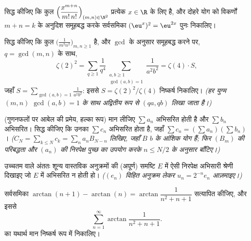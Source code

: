 \begin{exercise}[$\star\star$]\label{exo:b2:series:6}
सिद्ध कीजिए कि कुल $\Bigl(\dfrac{x^{m+n}}{m!\,n!}\Bigr)_{(m,n)\in\N^2}$ प्रत्येक $x \in \R$ के लिए  है, और दोहरे योग को
विकर्णों $m + n =
k$ के अनुदिश समूहबद्ध करके सर्वसमिका $(\eu^x)^2 =
\eu^{2x}$ पुनः निकालिए।
\end{exercise}

\begin{exercise}[$\star\star$]\label{exo:b2:series:7}
सिद्ध कीजिए कि कुल $\bigl(\frac{1}{m^2 n^2}\bigr)_{m,n \geq 1}$  है, और $\gcd$ के अनुसार समूहबद्ध करने पर, $q = \gcd(m,n)$
के साथ,
\[
\zeta(2)^2 = \sum_{q\geq1} \frac{1}{q^4}
\sum_{\substack{a,b \geq 1\\ \gcd(a,b)=1}} \frac{1}{a^2b^2}
= \zeta(4) \cdot S,
\]
जहाँ $S = \sum_{\gcd(a,b)=1} \frac{1}{a^2b^2}$: इससे $S =
\zeta(2)^2/\zeta(4)$ निष्कर्ष निकालिए। \emph{(हर युग्म $(m,n)$ $\gcd(a,b) = 1$ के साथ
अद्वितीय रूप से $(qa, qb)$ लिखा जाता है।)}
\end{exercise}

\begin{exercise}[$\star\star\star$]\label{exo:b2:series:8}
(गुणनफलों पर आबेल की प्रमेय, हल्का रूप) मान लीजिए $\sum a_n$ 
अभिसरित होती है और $\sum b_n$ अभिसरित। सिद्ध कीजिए कि उनका  $\sum c_n$
अभिसरित होता है, जहाँ $\sum c_n = (\sum
a_n)(\sum b_n)$। \emph{($C_N = \sum_{k\leq N} c_k = \sum_n
a_n B_{N-n}$ लिखिए, जहाँ $B$ $b$ के आंशिक योग
हैं; फिर $(B_m)$ की परिबद्धता और $(a_n)$ की निरपेक्ष पुच्छ का उपयोग करके $n \leq N/2$
के अनुसार बाँटिए।)}
\end{exercise}

\begin{exercise}[$\star\star\star$]\label{exo:b2:series:9}
उच्चतम  वाले अंततः शून्य वास्तविक अनुक्रमों की (अपूर्ण) समष्टि $E$
में ऐसी निरपेक्ष अभिसारी श्रेणी दिखाइए जो $E$ में अभिसरित न होती हो।
\emph{($(e_n)$ विहित अनुक्रम लेकर $u_n = 2^{-n} e_n$ आज़माइए।)}
\end{exercise}

\begin{exercise}[$\star\star$]\label{exo:b2:series:10}
सर्वसमिका $\arctan(n+1) - \arctan(n) =
\arctan\dfrac{1}{n^2 + n + 1}$ सत्यापित कीजिए, और इससे
\[
\sum_{n=1}^{\infty} \arctan\frac{1}{n^2 + n + 1} .
\]
का यथार्थ मान निष्कर्ष रूप में निकालिए।
\end{exercise}

